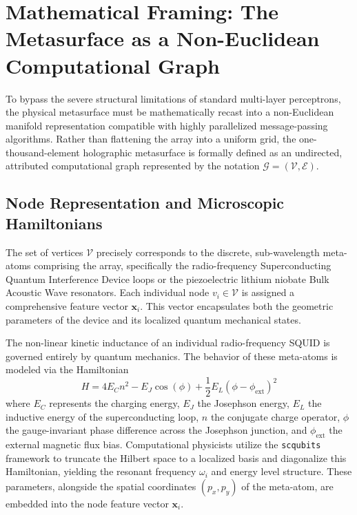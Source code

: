\documentclass[11pt, a4paper]{article}
\begin{document}
\section{Mathematical Framing: The Metasurface as a Non-Euclidean Computational Graph}

To bypass the severe structural limitations of standard multi-layer perceptrons, the physical metasurface must be mathematically recast into a non-Euclidean manifold representation compatible with highly parallelized message-passing algorithms. Rather than flattening the array into a uniform grid, the one-thousand-element holographic metasurface is formally defined as an undirected, attributed computational graph represented by the notation $\mathcal{G} = (\mathcal{V}, \mathcal{E})$.

\subsection{Node Representation and Microscopic Hamiltonians}

The set of vertices $\mathcal{V}$ precisely corresponds to the discrete, sub-wavelength meta-atoms comprising the array, specifically the radio-frequency Superconducting Quantum Interference Device loops or the piezoelectric lithium niobate Bulk Acoustic Wave resonators. Each individual node $v_i \in \mathcal{V}$ is assigned a comprehensive feature vector $\mathbf{x}_i$. This vector encapsulates both the geometric parameters of the device and its localized quantum mechanical states.

The non-linear kinetic inductance of an individual radio-frequency SQUID is governed entirely by quantum mechanics. The behavior of these meta-atoms is modeled via the Hamiltonian
\begin{equation}
H = 4E_C n^2 - E_J \cos(\phi) + \frac{1}{2} E_L(\phi - \phi_{\mathrm{ext}})^2
\end{equation}
where $E_C$ represents the charging energy, $E_J$ the Josephson energy, $E_L$ the inductive energy of the superconducting loop, $n$ the conjugate charge operator, $\phi$ the gauge-invariant phase difference across the Josephson junction, and $\phi_{\mathrm{ext}}$ the external magnetic flux bias. Computational physicists utilize the \texttt{scqubits} framework to truncate the Hilbert space to a localized basis and diagonalize this Hamiltonian, yielding the resonant frequency $\omega_i$ and energy level structure. These parameters, alongside the spatial coordinates $(p_x, p_y)$ of the meta-atom, are embedded into the node feature vector $\mathbf{x}_i$.
\end{document}
